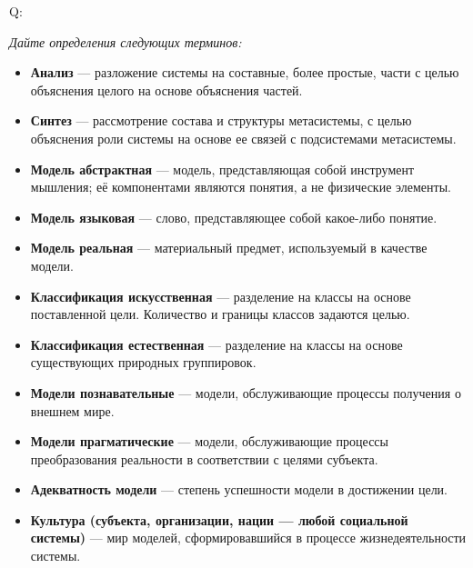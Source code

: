 \documentclass{article}
\newcommand{\define}[2]{
	\textbf{#1} --- #2
	}
\newcommand{\question}[2]{
	\begin{flushright}
		Q:\hspace{2ex}\vline\hspace{2ex}
		\begin{minipage}{0.9\textwidth}
			\large
			\textit{#1}
		\end{minipage}
	\end{flushright}
	\begin{center}
		\begin{minipage}{0.95\textwidth}
			#2
		\end{minipage}
	\end{center}
	}
\begin{document}
\question{Дайте определения следующих терминов:}{
	\begin{itemize}
		\item \define{Анализ}{разложение системы на составные, более простые, части с целью объяснения целого на основе объяснения частей.}
		\item \define{Синтез}{рассмотрение состава и структуры метасистемы, с целью объяснения роли системы на основе ее связей с подсистемами метасистемы.}
		\item \define{Модель абстрактная}{модель, представляющая собой инструмент мышления; её компонентами являются понятия, а не физические элементы.}
		\item \define{Модель языковая}{слово, представляющее собой какое-либо понятие.}
		\item \define{Модель реальная}{материальный предмет, используемый в качестве модели.}
		\item \define{Классификация искусственная}{разделение на классы на основе поставленной цели. Количество и границы классов задаются целью.}
		\item \define{Классификация естественная}{разделение на классы на основе существующих природных группировок.}
		\item \define{Модели познавательные}{модели, обслуживающие процессы получения о внешнем мире.}
		\item \define{Модели прагматические}{модели, обслуживающие процессы преобразования реальности в соответствии с целями субъекта.}
		\item \define{Адекватность модели}{степень успешности модели в достижении цели.}
		\item \define{Культура (субъекта, организации, нации --- любой социальной системы)}{мир моделей, сформировавшийся в процессе жизнедеятельности системы.}
	\end{itemize}}
\end{document}
